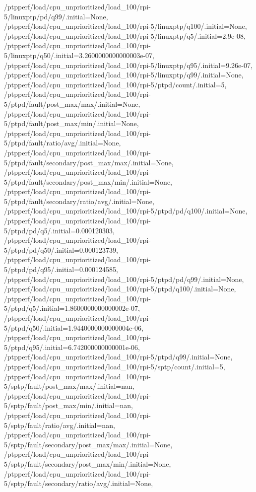 {    /ptpperf/load/cpu_unprioritized/load_100/rpi-5/linuxptp/pd/q99/.initial=None,
    /ptpperf/load/cpu_unprioritized/load_100/rpi-5/linuxptp/q100/.initial=None,
    /ptpperf/load/cpu_unprioritized/load_100/rpi-5/linuxptp/q5/.initial=2.9e-08,
    /ptpperf/load/cpu_unprioritized/load_100/rpi-5/linuxptp/q50/.initial=3.2600000000000003e-07,
    /ptpperf/load/cpu_unprioritized/load_100/rpi-5/linuxptp/q95/.initial=9.26e-07,
    /ptpperf/load/cpu_unprioritized/load_100/rpi-5/linuxptp/q99/.initial=None,
    /ptpperf/load/cpu_unprioritized/load_100/rpi-5/ptpd/count/.initial=5,
    /ptpperf/load/cpu_unprioritized/load_100/rpi-5/ptpd/fault/post_max/max/.initial=None,
    /ptpperf/load/cpu_unprioritized/load_100/rpi-5/ptpd/fault/post_max/min/.initial=None,
    /ptpperf/load/cpu_unprioritized/load_100/rpi-5/ptpd/fault/ratio/avg/.initial=None,
    /ptpperf/load/cpu_unprioritized/load_100/rpi-5/ptpd/fault/secondary/post_max/max/.initial=None,
    /ptpperf/load/cpu_unprioritized/load_100/rpi-5/ptpd/fault/secondary/post_max/min/.initial=None,
    /ptpperf/load/cpu_unprioritized/load_100/rpi-5/ptpd/fault/secondary/ratio/avg/.initial=None,
    /ptpperf/load/cpu_unprioritized/load_100/rpi-5/ptpd/pd/q100/.initial=None,
    /ptpperf/load/cpu_unprioritized/load_100/rpi-5/ptpd/pd/q5/.initial=0.000120303,
    /ptpperf/load/cpu_unprioritized/load_100/rpi-5/ptpd/pd/q50/.initial=0.000123739,
    /ptpperf/load/cpu_unprioritized/load_100/rpi-5/ptpd/pd/q95/.initial=0.000124585,
    /ptpperf/load/cpu_unprioritized/load_100/rpi-5/ptpd/pd/q99/.initial=None,
    /ptpperf/load/cpu_unprioritized/load_100/rpi-5/ptpd/q100/.initial=None,
    /ptpperf/load/cpu_unprioritized/load_100/rpi-5/ptpd/q5/.initial=1.8600000000000002e-07,
    /ptpperf/load/cpu_unprioritized/load_100/rpi-5/ptpd/q50/.initial=1.9440000000000004e-06,
    /ptpperf/load/cpu_unprioritized/load_100/rpi-5/ptpd/q95/.initial=6.742000000000001e-06,
    /ptpperf/load/cpu_unprioritized/load_100/rpi-5/ptpd/q99/.initial=None,
    /ptpperf/load/cpu_unprioritized/load_100/rpi-5/sptp/count/.initial=5,
    /ptpperf/load/cpu_unprioritized/load_100/rpi-5/sptp/fault/post_max/max/.initial=nan,
    /ptpperf/load/cpu_unprioritized/load_100/rpi-5/sptp/fault/post_max/min/.initial=nan,
    /ptpperf/load/cpu_unprioritized/load_100/rpi-5/sptp/fault/ratio/avg/.initial=nan,
    /ptpperf/load/cpu_unprioritized/load_100/rpi-5/sptp/fault/secondary/post_max/max/.initial=None,
    /ptpperf/load/cpu_unprioritized/load_100/rpi-5/sptp/fault/secondary/post_max/min/.initial=None,
    /ptpperf/load/cpu_unprioritized/load_100/rpi-5/sptp/fault/secondary/ratio/avg/.initial=None,
}
